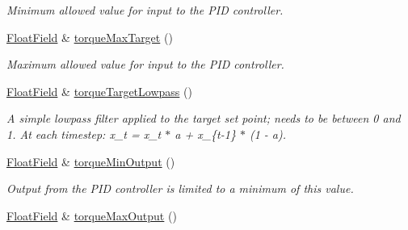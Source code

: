 \begin{DoxyCompactItemize}
\begin{DoxyCompactList}\small\item\em Minimum allowed value for input to the P\+ID controller. \end{DoxyCompactList}\item 
\hyperlink{classhebi_1_1Command_1_1FloatField}{Float\+Field} \& \hyperlink{classhebi_1_1Command_1_1Settings_1_1Actuator_1_1TorqueGains_a28cffcd43a7f66008553806e9e15fbd2}{torque\+Max\+Target} ()\hypertarget{classhebi_1_1Command_1_1Settings_1_1Actuator_1_1TorqueGains_a28cffcd43a7f66008553806e9e15fbd2}{}\label{classhebi_1_1Command_1_1Settings_1_1Actuator_1_1TorqueGains_a28cffcd43a7f66008553806e9e15fbd2}

\begin{DoxyCompactList}\small\item\em Maximum allowed value for input to the P\+ID controller. \end{DoxyCompactList}\item 
\hyperlink{classhebi_1_1Command_1_1FloatField}{Float\+Field} \& \hyperlink{classhebi_1_1Command_1_1Settings_1_1Actuator_1_1TorqueGains_aa6e4bb44277c15e41db428125c785de9}{torque\+Target\+Lowpass} ()\hypertarget{classhebi_1_1Command_1_1Settings_1_1Actuator_1_1TorqueGains_aa6e4bb44277c15e41db428125c785de9}{}\label{classhebi_1_1Command_1_1Settings_1_1Actuator_1_1TorqueGains_aa6e4bb44277c15e41db428125c785de9}

\begin{DoxyCompactList}\small\item\em A simple lowpass filter applied to the target set point; needs to be between 0 and 1. At each timestep\+: x\+\_\+t = x\+\_\+t $\ast$ a + x\+\_\+\{t-\/1\} $\ast$ (1 -\/ a). \end{DoxyCompactList}\item 
\hyperlink{classhebi_1_1Command_1_1FloatField}{Float\+Field} \& \hyperlink{classhebi_1_1Command_1_1Settings_1_1Actuator_1_1TorqueGains_a22891ff90383ef13298ce8e059d7188a}{torque\+Min\+Output} ()\hypertarget{classhebi_1_1Command_1_1Settings_1_1Actuator_1_1TorqueGains_a22891ff90383ef13298ce8e059d7188a}{}\label{classhebi_1_1Command_1_1Settings_1_1Actuator_1_1TorqueGains_a22891ff90383ef13298ce8e059d7188a}

\begin{DoxyCompactList}\small\item\em Output from the P\+ID controller is limited to a minimum of this value. \end{DoxyCompactList}\item 
\hyperlink{classhebi_1_1Command_1_1FloatField}{Float\+Field} \& \hyperlink{classhebi_1_1Command_1_1Settings_1_1Actuator_1_1TorqueGains_a590d35a63babac36bad9f6ab40572952}{torque\+Max\+Output} ()\hypertarget{classhebi_1_1Command_1_1Settings_1_1Actuator_1_1TorqueGains_a590d35a63babac36bad9f6ab40572952}{}\label{classhebi_1_1Command_1_1Settings_1_1Actuator_1_1TorqueGains_a590d35a63babac36bad9f6ab40572952}


\end{DoxyCompactItemize}
